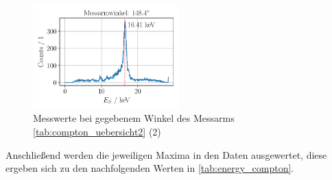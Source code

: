 \documentclass[ngerman]{scrartcl}
\begin{document}
\begin{figure}[H]
    \centering
    \begin{samepage}
        \includegraphics[width=0.5\textwidth]{../plots/energie_spektren_9.pdf}
        \caption{Messwerte bei gegebenem Winkel des Messarms \autoref{tab:compton_uebersicht2} (2)} %
        \label{fig:compton_uebersicht2}
    \end{samepage}
\end{figure}
%
Anschließend werden die jeweiligen Maxima in den Daten ausgewertet, diese ergeben sich zu den nachfolgenden Werten in \autoref{tab:energy_compton}.
\end{document}
